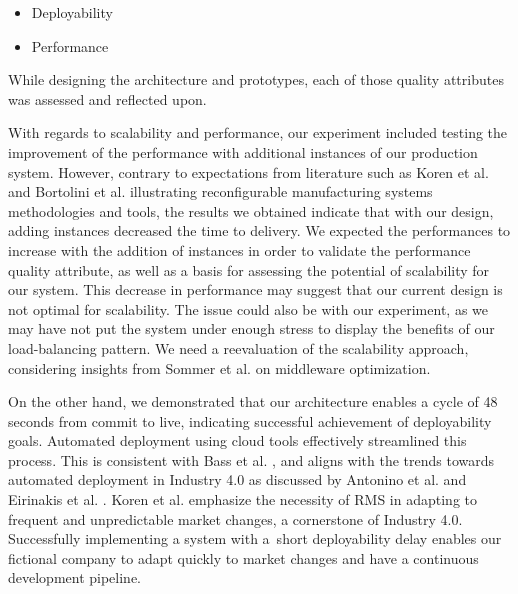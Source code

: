 \documentclass[conference]{IEEEtran}
\begin{document}
\begin{itemize}
    \item Deployability
\end{itemize}

\begin{itemize}
    \item Performance
\end{itemize}

While designing the architecture and prototypes, each of those quality attributes was assessed and reflected upon.

With regards to scalability and performance, our experiment included testing the improvement of the performance with additional instances of our production system. However, contrary to expectations from literature such as Koren et al. \cite{Koren1999Reconfigurable} and Bortolini et al. \cite{Bortolini2018Reconfigurable} illustrating reconfigurable manufacturing systems methodologies and tools, the results we obtained indicate that with our design, adding instances decreased the time to delivery.
We expected the performances to increase with the addition of instances in order to validate the performance quality attribute, as well as a basis for assessing the potential of scalability for our system. 
This decrease in performance may suggest that our current design is not optimal for scalability. The issue could also be with our experiment, as we may have not put the system under enough stress to display the benefits of our load-balancing pattern. We need a reevaluation of the scalability approach, considering insights from Sommer et al. \cite{Sommer2018Message} on middleware optimization.

On the other hand, we demonstrated that our architecture enables a cycle of 48 seconds from commit to live, indicating successful achievement of deployability goals. Automated deployment using cloud tools effectively streamlined this process. 
This is consistent with Bass et al. \cite{Bass2012Software}, and aligns with the trends towards automated deployment in Industry 4.0 as discussed by Antonino et al. \cite{Antonino2019Blueprints} and Eirinakis et al. \cite{Eirinakis2017Proposal}.
Koren et al. \cite{Koren1999Reconfigurable} emphasize the necessity of RMS in adapting to frequent and unpredictable market changes, a cornerstone of Industry 4.0. Successfully implementing a system with a~short deployability delay enables our fictional company to adapt quickly to market changes and have a continuous development pipeline.   
\end{document}
